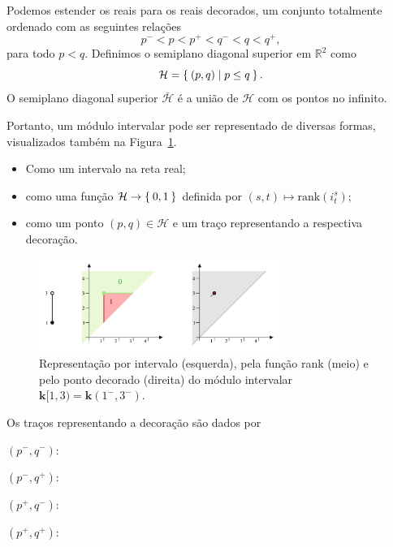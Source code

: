 Podemos estender os reais para os reais decorados, um conjunto totalmente ordenado com as seguintes relações
\begin{equation*}
    p^- < p < p^+ < q^- < q < q^+,
\end{equation*}
para todo $p < q$. Definimos o semiplano diagonal superior em $\mathbb{R}^2$ como 
\begin{equation*}
    \mathcal{H} = \Set{(p,q) | p \leq q}.
\end{equation*}
O semiplano diagonal superior $\bar{\mathcal{H}}$ é a união de $\mathcal{H}$ com os pontos no infinito. 

Portanto, um módulo intervalar pode ser representado de diversas formas, visualizados também na Figura~\ref{fig:mod_int}.
\begin{itemize}
    \item Como um intervalo na reta real;
    \item como uma função $\mathcal{H} \to \Set{0,1}$ definida por $(s,t) \mapsto \text{rank}(i^s_t)$; 
    \item como um ponto $(p,q) \in \mathcal{H}$ e um traço representando a respectiva decoração.
\end{itemize}
 
\begin{figure}[htpb!] 
    \centering
    \includegraphics[width=0.7\textwidth]{images/ex_interval_module.png}
    \caption{Representação por intervalo (esquerda), pela função rank (meio) e pelo ponto decorado (direita) do 
            módulo intervalar $\mathbf{k}[1,3) = \mathbf{k}(1^-, 3^-)$.}  
    \label{fig:mod_int}
\end{figure}
Os traços representando a decoração são dados por
\begin{center}
    $(p^-,q^-): $ 

    $(p^-,q^+): $ 

    $(p^+,q^-): $ 

    $(p^+,q^+): $ 
\end{center}

